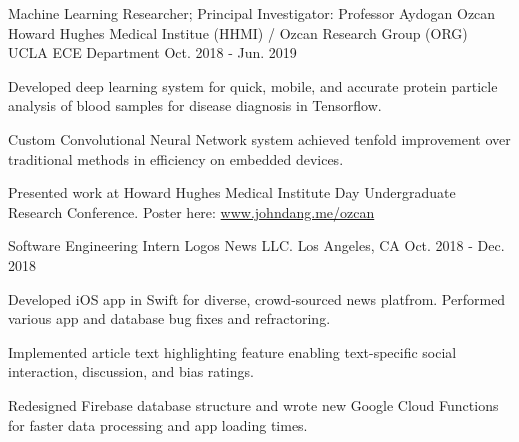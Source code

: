 \begin{cventries}
  \cventry
    {Machine Learning Researcher; Principal Investigator: Professor Aydogan Ozcan} %
    {Howard Hughes Medical Institue (HHMI) / Ozcan Research Group (ORG)} %
    {UCLA ECE Department} %
    {Oct. 2018 - Jun. 2019} %
    {
      \begin{cvitems} %
        \item {Developed deep learning system for quick, mobile, and accurate protein particle analysis of blood samples for disease diagnosis in Tensorflow.}
        \item {Custom Convolutional Neural Network system achieved tenfold improvement over traditional methods in efficiency on embedded devices.}
        \item Presented work at Howard Hughes Medical Institute Day Undergraduate Research Conference. Poster here: \href{https://www.johndang.me/ozcan}{www.johndang.me/ozcan}
      \end{cvitems}
    }

  \cventry
    {Software Engineering Intern} %
    {Logos News LLC.} %
    {Los Angeles, CA} %
    {Oct. 2018 - Dec. 2018} %
    {
      \begin{cvitems} %
        \item {Developed iOS app in Swift for diverse, crowd-sourced news platfrom. Performed various app and database bug fixes and refractoring.
        \item Implemented article text highlighting feature enabling text-specific social interaction, discussion, and bias ratings.}
        \item Redesigned Firebase database structure and wrote new Google Cloud Functions for faster data processing and app loading times.
      \end{cvitems}
    }

\end{cventries}

